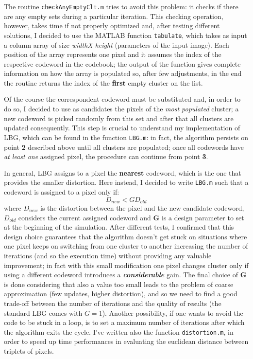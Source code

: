 \documentclass{report}
\def\code#1{\texttt{#1}}
\begin{document}
The routine \code{checkAnyEmptyClt.m} tries to avoid this problem: it checks if there are any empty sets during a particular iteration. This checking operation, however, takes time if not properly optimized and, after testing different solutions, I decided to use the MATLAB function \code{tabulate}, which takes as input a column array of size \textit{widthX height} (parameters of the input image). Each position of the array represents one pixel and it assumes the index of the respective codeword in the codebook; the output of the function gives complete information on how the array is populated so, after few adjustments, in the end the routine returns the index of the \textbf{first} empty cluster on the list. 

Of the course the correspondent codeword must be substituted and, in order to do so, I decided to use as candidates the pixels of the \textit{most populated} cluster; a new codeword is picked randomly from this set and after that all clusters are updated consequently. This step is crucial to understand my implementation of LBG, which can be found in the function \code{LBG.m}: in fact, the algorithm persists on point \textbf{2} described above until all clusters are populated; once all codewords have \textit{at least one} assigned pixel, the procedure can continue from point \textbf{3}.

In general, LBG assigns to a pixel the \textbf{nearest} codeword, which is the one that provides the smaller distortion. Here instead, I decided to write \code{LBG.m} such that a codeword is assigned to a pixel only if: 
\begin{equation}
D_{new} < GD_{old}
\end{equation}
where $D_{new}$ is the distortion between the pixel and the new candidate codeword, $D_{old}$ considers the current assigned codeword and $\mathbf{G}$ is a design parameter to set at the beginning of the simulation. After different tests, I confirmed that this design choice guarantees that the algorithm doesn't get stuck on situations where one pixel keeps on switching from one cluster to another increasing the number of iterations (and so the execution time) without providing any valuable improvement; in fact with this small modification one pixel changes cluster only if using a different codeword introduces a \textbf{\textit{considerable}} gain. The final choice of \textbf{G} is done considering that also a value too small leads to the problem of coarse approximation (few updates, higher distortion), and so we need to find a good trade-off between the number of iterations and the quality of results (the standard LBG comes with $G = 1$).
Another possibility, if one wants to avoid the code to be stuck in a loop, is to set a maximum number of iterations after which the algorithm exits the cycle.
I've written also the function \code{distortion.m}, in order to speed up time performances in evaluating the euclidean distance between triplets of pixels.
\end{document}
